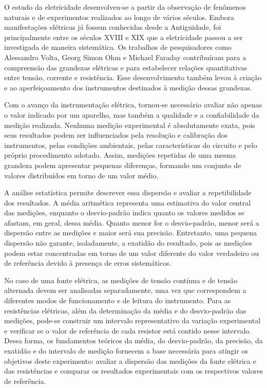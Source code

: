 \documentclass[a4paper,12pt]{article}
\begin{document}
O estudo da eletricidade desenvolveu-se a partir da observação de fenômenos naturais e de experimentos realizados ao longo de vários séculos. Embora manifestações elétricas já fossem conhecidas desde a Antiguidade, foi principalmente entre os séculos XVIII e XIX que a eletricidade passou a ser investigada de maneira sistemática. Os trabalhos de pesquisadores como Alessandro Volta, Georg Simon Ohm e Michael Faraday contribuíram para a compreensão das grandezas elétricas e para estabelecer relações quantitativas entre tensão, corrente e resistência. Esse desenvolvimento também levou à criação e ao aperfeiçoamento dos instrumentos destinados à medição dessas grandezas.

Com o avanço da instrumentação elétrica, tornou-se necessário avaliar não apenas o valor indicado por um aparelho, mas também a qualidade e a confiabilidade da medição realizada. Nenhuma medição experimental é absolutamente exata, pois seus resultados podem ser influenciados pela resolução e calibração dos instrumentos, pelas condições ambientais, pelas características do circuito e pelo próprio procedimento adotado. Assim, medições repetidas de uma mesma grandeza podem apresentar pequenas diferenças, formando um conjunto de valores distribuídos em torno de um valor médio.

A análise estatística permite descrever essa dispersão e avaliar a repetibilidade dos resultados. A média aritmética representa uma estimativa do valor central das medições, enquanto o desvio-padrão indica quanto os valores medidos se afastam, em geral, dessa média. Quanto menor for o desvio-padrão, menor será a dispersão entre as medições e maior será sua precisão. Entretanto, uma pequena dispersão não garante, isoladamente, a exatidão do resultado, pois as medições podem estar concentradas em torno de um valor diferente do valor verdadeiro ou de referência devido à presença de erros sistemáticos.

No caso de uma fonte elétrica, as medições de tensão contínua e de tensão alternada devem ser analisadas separadamente, uma vez que correspondem a diferentes modos de funcionamento e de leitura do instrumento. Para as resistências elétricas, além da determinação da média e do desvio-padrão das medições, pode-se construir um intervalo representativo da variação experimental e verificar se o valor de referência de cada resistor está contido nesse intervalo. Dessa forma, os fundamentos teóricos da média, do desvio-padrão, da precisão, da exatidão e do intervalo de medição fornecem a base necessária para atingir os objetivos deste experimento: avaliar a dispersão das medições da fonte elétrica e das resistências e comparar os resultados experimentais com os respectivos valores de referência.
\end{document}
